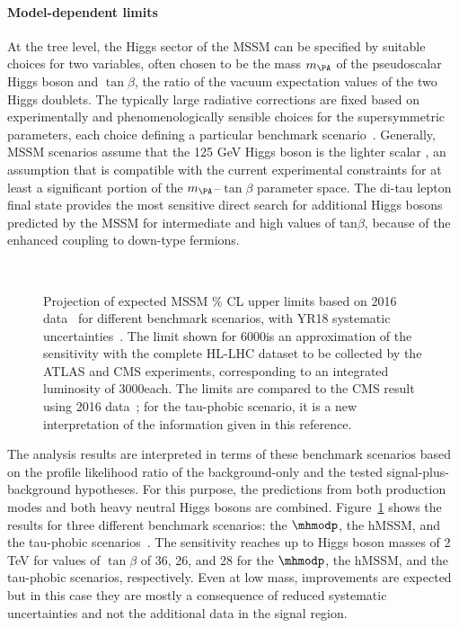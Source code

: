 \paragraph{Model-dependent limits}
\label{sec:model_dep}
%
At the tree level, the Higgs sector of the MSSM can be specified by suitable choices for two variables, 
often chosen to be the mass $m_{\PA}$ of the pseudoscalar Higgs boson
and $\tan\beta$, the ratio of the \mbox{vacuum} expectation
values of the two Higgs doublets.
The typically large radiative corrections are 
fixed based on experimentally and phenomenologically sensible choices for
the supersymmetric parameters, each choice defining a particular benchmark scenario~\cite{Carena:2013ytb}.
Generally, MSSM scenarios assume that the 125 GeV Higgs boson is the lighter scalar \Ph, 
an assumption that is compatible with the current experimental constraints 
for at least a significant portion of the $m_{\PA}$--$\tan\beta$ parameter space.
The di-tau lepton final state provides the most sensitive direct search for additional
Higgs bosons predicted by the MSSM for intermediate and high values of tan$\beta$, 
because of the enhanced
coupling to down-type fermions.
%
\begin{figure}[htbp]
\begin{center}
\\
\end{center}
\caption{Projection of expected MSSM \% CL upper limits based on 2016 data~\cite{HIG-17-020} for different benchmark 
scenarios, with YR18 systematic uncertainties~\cite{CMS-PAS-FTR-18-017}. The limit shown for 6000\fbinv is an approximation of the sensitivity with 
the complete HL-LHC dataset to be collected by the ATLAS and CMS experiments, corresponding to an integrated luminosity of 3000\fbinv each. 
The limits are compared to the CMS result using 2016 data~\cite{HIG-17-020}; for the tau-phobic scenario, 
it is a new interpretation of the information given in this reference. 
}
\label{fig:model_mssm1}
\end{figure}

The analysis results are interpreted in terms of these benchmark scenarios based on the profile likelihood ratio of the 
background-only and the tested signal-plus-background hypotheses. 
For this purpose, the predictions from both production modes and both heavy neutral Higgs bosons are combined.
Figure~\ref{fig:model_mssm1} shows the results 
for three different benchmark scenarios:
the $\mhmodp$, the hMSSM, and the tau-phobic scenarios~\cite{HIG-17-020}.
The sensitivity reaches up to Higgs boson masses
of 2 TeV for values of $\tan \beta$ of 36, 26, and 28
for the $\mhmodp$, the hMSSM, and the tau-phobic scenarios,
respectively.
Even at low mass, improvements are expected but in this case they are mostly 
a consequence of reduced systematic uncertainties and not 
the additional data in the signal region.